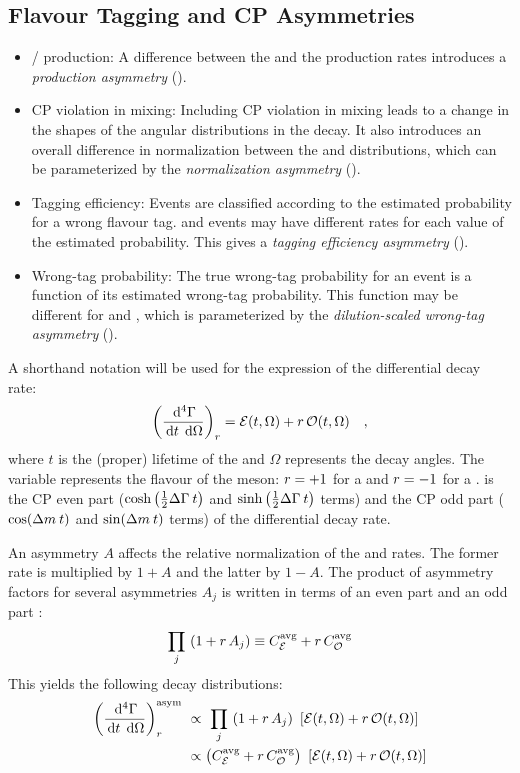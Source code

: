 \subsection{Flavour Tagging and CP Asymmetries} \label{sec:tagAsym}
\begin{itemize}
  \item \B/\Bb{} production: A difference between the \B{} and \Bb{} the production rates
    introduces a \emph{production asymmetry} (\AProd).
  \item CP violation in mixing: Including CP violation in mixing leads to a change in the shapes of
    the angular distributions in the decay. It also introduces an overall difference in
    normalization between the \B{} and \Bb{} distributions, which can be parameterized by the
    \emph{normalization asymmetry} (\ANorm).
  \item Tagging efficiency: Events are classified according to the estimated probability for a
    wrong flavour tag. \B{} and \Bb{} events may have different rates for each value of the
    estimated probability. This gives a \emph{tagging efficiency asymmetry} (\ATagEff).
  \item Wrong-tag probability: The true wrong-tag probability for an event is a function of its
    estimated wrong-tag probability. This function may be different for \B{} and \Bb, which is
    parameterized by the \emph{dilution-scaled wrong-tag asymmetry} (\ADilWTag).
\end{itemize}

A shorthand notation will be used for the expression of the differential decay rate:
\begin{equation} \label{eq:diffRateShort}
  \left(\frac{\,\mathrm{d}^{4} \Gamma}{\,\mathrm{d} t \;\,\mathrm{d}\Omega}\right)_{r}
    = {\mathcal{E}}(t, \Omega) + {r}\,{\mathcal{O}}(t, \Omega) \quad,
\end{equation}
where $t$ is the (proper) lifetime of the \B{} and $\Omega$ represents the decay angles. The
variable \iTag{} represents the flavour of the \B{} meson: ${r}=+1$ for a \B{} and ${r}=-1$ for
a \Bb. \even{} is the CP even part ($\cosh\left(\tfrac{1}{2}{\Delta\Gamma_{}}\,t\right)$ and
$\sinh\left(\tfrac{1}{2}{\Delta\Gamma_{}}\,t\right)$ terms) and \odd{} the CP odd part ($\cos({\Delta m_{}}\,t)$ and
$\sin({\Delta m_{}}\,t)$ terms) of the differential decay rate.

An asymmetry $A$ affects the relative normalization of the \B{} and \Bb{} rates. The former rate is
multiplied by $1+A$ and the latter by $1-A$.  The product of asymmetry factors for several
asymmetries $A_j$ is written in terms of an even part \avgCEven and an odd part \avgCOdd:
\begin{equation} \label{eq:asymProd}
  \prod_j\ (1+{r}\,A_j) \equiv {\ensuremath{C_{{\mathcal{E}}_{}}^{\text{avg}}}} + {r}\,{C_{{\mathcal{O}}_{}}^{\text{avg}}}
\end{equation}
This yields the following decay distributions:
\begin{align} \label{eq:diffRateAsym}
  \left(\frac{\,\mathrm{d}^{4} \Gamma}{\,\mathrm{d} t \;\,\mathrm{d}\Omega}\right)_{r}^{\text{asym}}
    \ &\propto\ \prod_j\ (1+{r}\,A_j)\ \left[{\mathcal{E}}(t, \Omega)
      + {r}\,{\mathcal{O}}(t, \Omega)\right] \nonumber\\
    &\propto \left({C_{{\mathcal{E}}_{}}^{\text{avg}}} + {r}\,{C_{{\mathcal{O}}_{}}^{\text{avg}}}\right)
    \ \left[{\mathcal{E}}(t, \Omega) + {r}\,{\mathcal{O}}(t, \Omega)\right]
\end{align}

